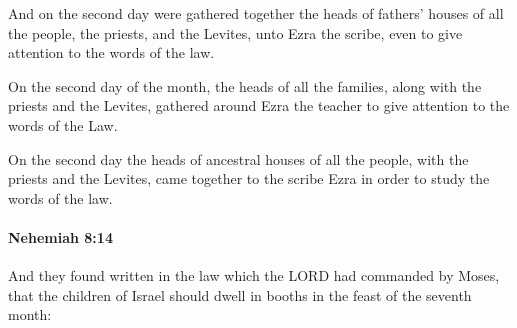 			\begin{versebox}
					\item[BHS] 
					\item[LXX] 
					\item[ASV] And on the second day were gathered together the heads of fathers' houses of all the people, the priests, and the Levites, unto Ezra the scribe, even to give attention to the words of the law.
					\item[NIV] On the second day of the month, the heads of all the families, along with the priests and the Levites, gathered around Ezra the teacher to give attention to the words of the Law.
					\item[NRSV] On the second day the heads of ancestral houses of all the people, with the priests and the Levites, came together to the scribe Ezra in order to study the words of the law.
			\end{versebox}

		\paragraph{Nehemiah 8:14} %
			\label{NEHEMIAH-8-14}

			And they found written in the law which the LORD had commanded by Moses, that the children of Israel should dwell in booths in the feast of the seventh month:

